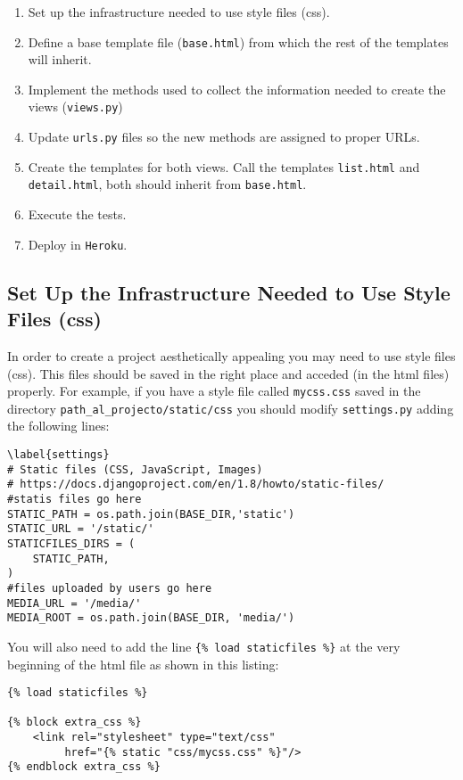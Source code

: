 \documentclass[12pt]{article} %
\newcommand{\ttt}[1]{\texttt{#1}}%
\newcommand{\hhh}[1]{\texttt{#1}}%
\newcommand{\views}{\texttt{views.py}}%
\newcommand{\settings}{\texttt{settings.py}}%
\newcommand{\urls}{\texttt{urls.py}}%
\newcommand{\heroku}{\texttt{Heroku}}
\begin{document}
\begin{enumerate}
 \item Set up the infrastructure needed to use style files (css).
 \item Define a base template file (\hhh{base.html}) from which the rest of the templates will inherit.
 \item Implement the methods used to collect the information needed to create the views (\views)
 \item Update \urls{} files so the new methods are assigned to proper URLs.
 \item Create the templates for both views. Call the templates \hhh{list.html} and \hhh{detail.html}, both should inherit from \hhh{base.html}.
 \item Execute the  tests.
 \item Deploy in \heroku.
\end{enumerate}

\subsection{Set Up the Infrastructure Needed to Use Style Files (css)}

In order to create a project aesthetically appealing you may need to use style files (css). This files should be saved in the right place and acceded (in the html files) properly. For example, if you have a style file called  \ttt{mycss.css} saved in the directory \texttt{path\_al\_projecto/static/css} you should modify \settings{} adding the following lines:

\begin{lstlisting}
\label{settings}
# Static files (CSS, JavaScript, Images)
# https://docs.djangoproject.com/en/1.8/howto/static-files/
#statis files go here
STATIC_PATH = os.path.join(BASE_DIR,'static')
STATIC_URL = '/static/'
STATICFILES_DIRS = (
    STATIC_PATH,
)
#files uploaded by users go here
MEDIA_URL = '/media/'
MEDIA_ROOT = os.path.join(BASE_DIR, 'media/')

\end{lstlisting}

You will also need to add the line \texttt{\{\% load  staticfiles \%\}} at the very beginning of the html file as shown in this listing:

\begin{lstlisting}
{% load staticfiles %}

{% block extra_css %}
    <link rel="stylesheet" type="text/css" 
         href="{% static "css/mycss.css" %}"/>
{% endblock extra_css %}
\end{lstlisting}
\end{document}
